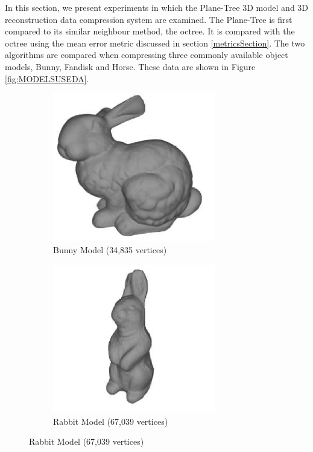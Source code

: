 
In this section, we present experiments in which the Plane-Tree 3D model and 3D reconstruction data compression system are examined. The Plane-Tree is first compared to its similar neighbour method, the octree. It is compared with the octree using the mean error metric discussed in section \ref{metricsSection}. The two algorithms are compared when compressing three commonly available object models, Bunny, Fandisk and Horse. These data are shown in Figure \ref{fig:MODELSUSEDA}. \\


\begin{figure}[H] 
        \begin{center}
 		\begin{subfigure}[b]{3in}
 			   \centering
 			   \includegraphics[width=2.8in]{images/experiments/test_data/models_used/bunny_34835}
 			   \captionsetup{justification=centering}
                \caption{Bunny Model (34,835 vertices)}
                \label{fig:MODELSUSEDA_BUNNY}
        \end{subfigure}%
        \begin{subfigure}[b]{3in}
                \includegraphics[width=2.8in]{images/experiments/test_data/models_used/rabbit_67039}
                \captionsetup{justification=centering}
                \caption{Rabbit Model (67,039 vertices)}

\end{subfigure}
\end{center}
\end{figure}
